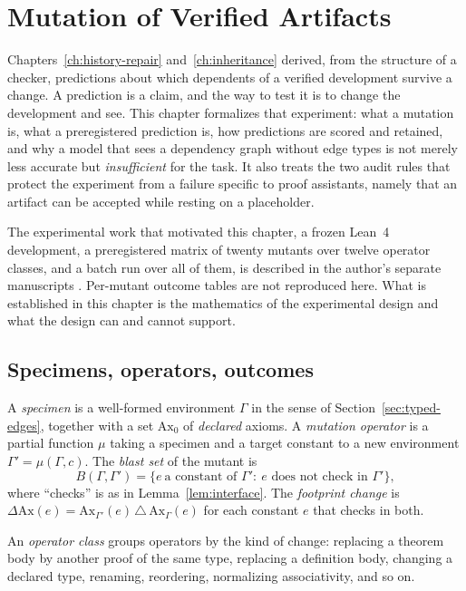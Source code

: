 \chapter{Mutation of Verified Artifacts}
\label{ch:mutation}

Chapters~\ref{ch:history-repair} and~\ref{ch:inheritance} derived, from the structure of a checker, predictions about which dependents of a verified development survive a change. A prediction is a claim, and the way to test it is to change the development and see. This chapter formalizes that experiment: what a mutation is, what a preregistered prediction is, how predictions are scored and retained, and why a model that sees a dependency graph without edge types is not merely less accurate but \emph{insufficient} for the task. It also treats the two audit rules that protect the experiment from a failure specific to proof assistants, namely that an artifact can be accepted while resting on a placeholder.

The experimental work that motivated this chapter, a frozen Lean~4 development, a preregistered matrix of twenty mutants over twelve operator classes, and a batch run over all of them, is described in the author's separate manuscripts \cite{flyxion-mutation}. Per-mutant outcome tables are not reproduced here. What is established in this chapter is the mathematics of the experimental design and what the design can and cannot support.

\section{Specimens, operators, outcomes}

\begin{definition}
\label{def:specimen}
A \emph{specimen} is a well-formed environment $\Gamma$ in the sense of Section~\ref{sec:typed-edges}, together with a set $\mathrm{Ax}_0$ of \emph{declared} axioms. A \emph{mutation operator} is a partial function $\mu$ taking a specimen and a target constant to a new environment $\Gamma'=\mu(\Gamma,c)$. The \emph{blast set} of the mutant is
\[
B(\Gamma,\Gamma')=\{e\ \text{a constant of }\Gamma':\ e\text{ does not check in }\Gamma'\},
\]
where ``checks'' is as in Lemma~\ref{lem:interface}. The \emph{footprint change} is $\Delta\mathrm{Ax}(e)=\mathrm{Ax}_{\Gamma'}(e)\,\triangle\,\mathrm{Ax}_{\Gamma}(e)$ for each constant $e$ that checks in both.
\end{definition}

An \emph{operator class} groups operators by the kind of change: replacing a theorem body by another proof of the same type, replacing a definition body, changing a declared type, renaming, reordering, normalizing associativity, and so on.

